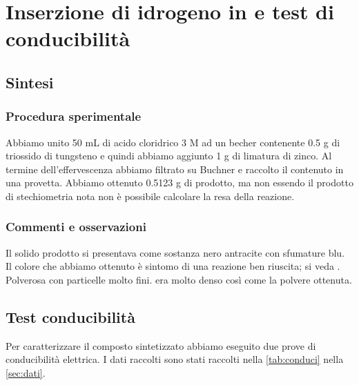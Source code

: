 \section{Inserzione di idrogeno in  e  test di conducibilità}
\subsection{Sintesi}
\subsubsection{Procedura sperimentale}

Abbiamo unito 50 mL di acido cloridrico 3 M ad un becher contenente 0.5 g di triossido di tungsteno e quindi abbiamo aggiunto 1 g di limatura di zinco. Al termine dell’effervescenza abbiamo filtrato su Buchner e raccolto il contenuto in una provetta. Abbiamo ottenuto 0.5123 g di prodotto, ma non essendo il prodotto di stechiometria nota non è possibile calcolare la resa della reazione.




\subsubsection{Commenti e osservazioni}


Il solido prodotto si presentava come sostanza nero antracite con sfumature blu. Il colore che abbiamo ottenuto è sintomo di una reazione ben riuscita; si veda \cite{conduzione}. Polverosa con particelle molto fini.
 era molto denso così come la polvere ottenuta. %

\subsection{Test conducibilità}

Per caratterizzare il composto sintetizzato abbiamo eseguito due prove di conducibilità elettrica. I dati raccolti sono stati raccolti nella \autoref{tab:conduci} nella \autoref{sec:dati}.





